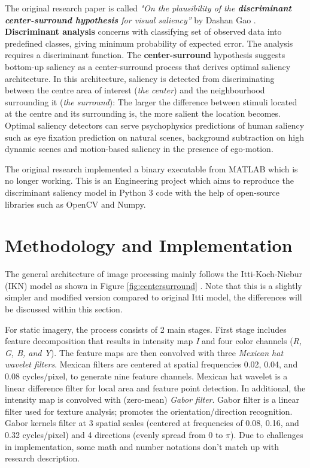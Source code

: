 \documentclass[conference]{IEEEtran}
\begin{document}
The original research paper is called  \textit{"On the plausibility of the \textbf{discriminant center-surround hypothesis} for visual saliency”} by Dashan Gao \cite{Gao_Vasconcelos_2008}. \textbf{Discriminant analysis} concerns with classifying set of observed data into predefined classes, giving minimum probability of expected error. The analysis requires a discriminant function. The \textbf{center-surround} hypothesis suggests bottom-up saliency as a center-surround process that derives optimal saliency architecture. In this architecture, saliency is detected from discriminating between the centre area of interest (\textit{the center}) and the neighbourhood surrounding it (\textit{the surround}): The larger the difference between stimuli located at the centre and its surrounding is, the more salient the location becomes. Optimal saliency detectors can serve psychophysics predictions of human saliency such as eye fixation prediction on natural scenes, background subtraction on high dynamic scenes and motion-based saliency in the presence of ego-motion. 

The original research implemented a binary executable from MATLAB which is no longer working. This is an Engineering project which aims to reproduce the discriminant saliency model in Python 3 code with the help of open-source libraries such as OpenCV and Numpy.

\section{Methodology and Implementation}
The general architecture of image processing mainly follows the Itti-Koch-Niebur (IKN) model as shown in Figure \ref{fig:centersurround} \cite{Xu_2008}. Note that this is a slightly simpler and modified version compared to original Itti model, the differences will be discussed within this section.

For static imagery, the process consists of 2 main stages. First stage includes feature decomposition that results in intensity map \textit{I} and four color channels (\textit{R, G, B, and Y}). The feature maps are then convolved with three \textit{Mexican hat wavelet filters}. Mexican filters are centered at spatial frequencies 0.02, 0.04, and 0.08 cycles/pixel, to generate nine feature channels. Mexican hat wavelet is a linear difference filter for local area and feature point detection. In additional, the intensity map is convolved with (zero-mean) \textit{Gabor filter}. Gabor filter is a linear filter used for texture analysis; promotes the orientation/direction recognition. Gabor kernels filter at 3 spatial scales (centered at frequencies of 0.08, 0.16, and 0.32 cycles/pixel) and 4 directions (evenly spread from 0 to $\pi$). Due to challenges in implementation, some math and number notations don't match up with research description.
\end{document}
